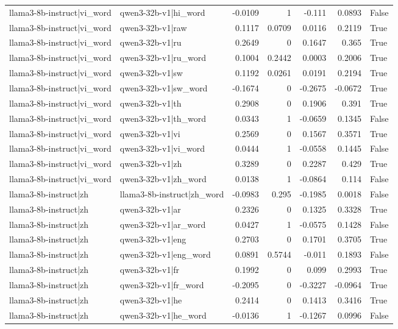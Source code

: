 \begin{table}
\begin{tabular}{l l r r r r l}
llama3-8b-instruct|vi_word & qwen3-32b-v1|hi_word & -0.0109 & 1 & -0.111 & 0.0893 & False \\
llama3-8b-instruct|vi_word & qwen3-32b-v1|raw & 0.1117 & 0.0709 & 0.0116 & 0.2119 & True \\
llama3-8b-instruct|vi_word & qwen3-32b-v1|ru & 0.2649 & 0 & 0.1647 & 0.365 & True \\
llama3-8b-instruct|vi_word & qwen3-32b-v1|ru_word & 0.1004 & 0.2442 & 0.0003 & 0.2006 & True \\
llama3-8b-instruct|vi_word & qwen3-32b-v1|sw & 0.1192 & 0.0261 & 0.0191 & 0.2194 & True \\
llama3-8b-instruct|vi_word & qwen3-32b-v1|sw_word & -0.1674 & 0 & -0.2675 & -0.0672 & True \\
llama3-8b-instruct|vi_word & qwen3-32b-v1|th & 0.2908 & 0 & 0.1906 & 0.391 & True \\
llama3-8b-instruct|vi_word & qwen3-32b-v1|th_word & 0.0343 & 1 & -0.0659 & 0.1345 & False \\
llama3-8b-instruct|vi_word & qwen3-32b-v1|vi & 0.2569 & 0 & 0.1567 & 0.3571 & True \\
llama3-8b-instruct|vi_word & qwen3-32b-v1|vi_word & 0.0444 & 1 & -0.0558 & 0.1445 & False \\
llama3-8b-instruct|vi_word & qwen3-32b-v1|zh & 0.3289 & 0 & 0.2287 & 0.429 & True \\
llama3-8b-instruct|vi_word & qwen3-32b-v1|zh_word & 0.0138 & 1 & -0.0864 & 0.114 & False \\
llama3-8b-instruct|zh & llama3-8b-instruct|zh_word & -0.0983 & 0.295 & -0.1985 & 0.0018 & False \\
llama3-8b-instruct|zh & qwen3-32b-v1|ar & 0.2326 & 0 & 0.1325 & 0.3328 & True \\
llama3-8b-instruct|zh & qwen3-32b-v1|ar_word & 0.0427 & 1 & -0.0575 & 0.1428 & False \\
llama3-8b-instruct|zh & qwen3-32b-v1|eng & 0.2703 & 0 & 0.1701 & 0.3705 & True \\
llama3-8b-instruct|zh & qwen3-32b-v1|eng_word & 0.0891 & 0.5744 & -0.011 & 0.1893 & False \\
llama3-8b-instruct|zh & qwen3-32b-v1|fr & 0.1992 & 0 & 0.099 & 0.2993 & True \\
llama3-8b-instruct|zh & qwen3-32b-v1|fr_word & -0.2095 & 0 & -0.3227 & -0.0964 & True \\
llama3-8b-instruct|zh & qwen3-32b-v1|he & 0.2414 & 0 & 0.1413 & 0.3416 & True \\
llama3-8b-instruct|zh & qwen3-32b-v1|he_word & -0.0136 & 1 & -0.1267 & 0.0996 & False \\

\end{tabular}
\end{table}

